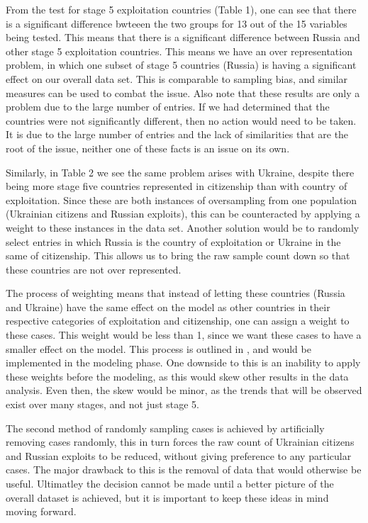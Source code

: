 \documentclass{article} %
\begin{document}
\FloatBarrier
From the test for stage 5 exploitation countries (Table 1), one can see that there is a significant difference bwteeen the two groups for 13 out of the 15 variables being tested. This means that there is a significant difference between Russia and other stage 5 exploitation countries. This means we have an over representation problem, in which one subset of stage 5 countries (Russia) is having a significant effect on our overall data set. This is comparable to sampling bias, and similar measures can be used to combat the issue. Also note that these results are only a problem due to the large number of entries. If we had determined that the countries were not significantly different, then no action would need to be taken. It is due to the large number of entries and the lack of similarities that are the root of the issue, neither one of these facts is an issue on its own.

Similarly, in Table 2 we see the same problem arises with Ukraine, despite there being more stage five countries represented in citizenship than with country of exploitation. Since these are both instances of oversampling from one population (Ukrainian citizens and Russian exploits), this can be counteracted by applying a weight to these instances in the data set. Another solution would be to randomly select entries in which Russia is the country of exploitation or Ukraine in the same of citizenship. This allows us to bring the raw sample count down so that these countries are not over represented.

The process of weighting means that instead of letting these countries (Russia and Ukraine) have the same effect on the model as other countries in their respective categories of exploitation and citizenship, one can assign a weight to these cases. This weight would be less than 1, since we want these cases to have a smaller effect on the model. This process is outlined in \cite{Oversample}, and would be implemented in the modeling phase. One downside to this is an inability to apply these weights before the modeling, as this would skew other results in the data analysis. Even then, the skew would be minor, as the trends that will be observed exist over many stages, and not just stage 5.

The second method of randomly sampling cases is achieved by artificially removing cases randomly, this in turn forces the raw count of Ukrainian citizens and Russian exploits to be reduced, without giving preference to any particular cases. The major drawback to this is the removal of data that would otherwise be useful. Ultimatley the decision cannot be made until a better picture of the overall dataset is achieved, but it is important to keep these ideas in mind moving forward.
\end{document}
